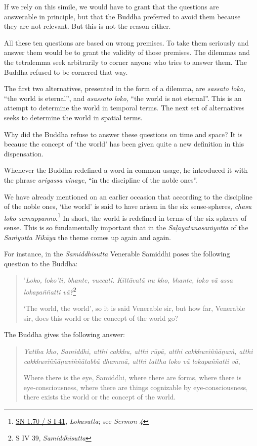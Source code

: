 If we rely on this simile, we would have to grant that the questions are answerable in principle, but that the Buddha preferred to avoid them because they are not relevant. But this is not the reason either.

All these ten questions are based on wrong premises. To take them seriously and answer them would be to grant the validity of those premises. The dilemmas and the tetralemma seek arbitrarily to corner anyone who tries to answer them. The Buddha refused to be cornered that way.

The first two alternatives, presented in the form of a dilemma, are \emph{sassato loko,} ``the world is eternal'', and \emph{asassato loko,} ``the world is not eternal''. This is an attempt to determine the world in temporal terms. The next set of alternatives seeks to determine the world in spatial terms.

Why did the Buddha refuse to answer these questions on time and space? It is because the concept of `the world' has been given quite a new definition in this dispensation.

Whenever the Buddha redefined a word in common usage, he introduced it with the phrase \emph{ariyassa vinaye}, ``in the discipline of the noble ones''.

We have already mentioned on an earlier occasion that according to the discipline of the noble ones, `the world' is said to have arisen in the six sense-spheres, \emph{chasu loko samuppanno}.\footnote{\href{https://suttacentral.net/sn1.70/pli/ms}{SN 1.70 / S I 41}, \emph{Lokasutta}; see \emph{Sermon 4}} In short, the world is redefined in terms of the six spheres of sense. This is so fundamentally important that in the \emph{Saḷāyatanasaṁyutta} of the \emph{Saṁyutta Nikāya} the theme comes up again and again.

For instance, in the \emph{Samiddhisutta} Venerable Samiddhi poses the following question to the Buddha:

\begin{quote}
'\emph{Loko, loko'ti, bhante, vuccati. Kittāvatā nu kho, bhante, loko vā assa lokapaññatti vā?}\footnote{S IV 39, \emph{Samiddhisutta}}

`The world, the world', so it is said Venerable sir, but how far, Venerable sir, does this world or the concept of the world go?
\end{quote}

The Buddha gives the following answer:

\begin{quote}
\emph{Yattha kho, Samiddhi, atthi cakkhu, atthi rūpā, atthi cakkhuviññāṇaṁ, atthi cakkhuviññāṇaviññātabbā dhammā, atthi tattha loko vā lokapaññatti vā},

Where there is the eye, Samiddhi, where there are forms, where there is eye-consciousness, where there are things cognizable by eye-consciousness, there exists the world or the concept of the world.
\end{quote}

